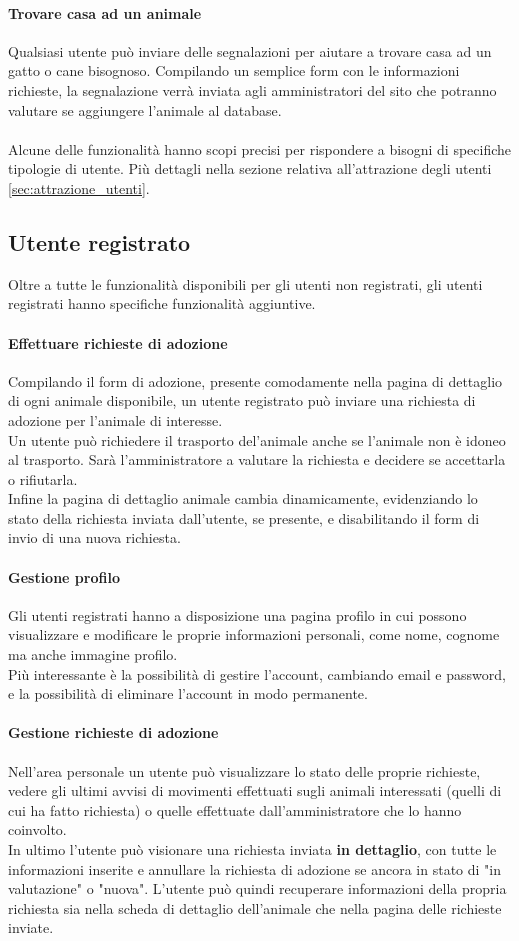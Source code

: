 \paragraph{Trovare casa ad un animale}
Qualsiasi utente può inviare delle segnalazioni per aiutare a trovare casa ad un gatto o cane bisognoso. Compilando un semplice form con le informazioni richieste, la segnalazione verrà inviata agli amministratori del sito che potranno valutare se aggiungere l'animale al database.\\\\
Alcune delle funzionalità hanno scopi precisi per rispondere a bisogni di specifiche tipologie di utente. Più dettagli nella sezione relativa all'attrazione degli utenti \ref{sec:attrazione_utenti}.
\subsection{Utente registrato}
Oltre a tutte le funzionalità disponibili per gli utenti non registrati, gli utenti registrati hanno specifiche funzionalità aggiuntive.
\paragraph{Effettuare richieste di adozione}
Compilando il form di adozione, presente comodamente nella pagina di dettaglio di ogni animale disponibile, un utente registrato può inviare una richiesta di adozione per l'animale di interesse.\\
Un utente può richiedere il trasporto del'animale anche se l'animale non è idoneo al trasporto. Sarà l'amministratore a valutare la richiesta e decidere se accettarla o rifiutarla.\\
Infine la pagina di dettaglio animale cambia dinamicamente, evidenziando lo stato della richiesta inviata dall'utente, se presente, e disabilitando il form di invio di una nuova richiesta.
\paragraph{Gestione profilo}
Gli utenti registrati hanno a disposizione una pagina profilo in cui possono visualizzare e modificare le proprie informazioni personali, come nome, cognome ma anche immagine profilo.\\
Più interessante è la possibilità di gestire l'account, cambiando email e password, e la possibilità di eliminare l'account in modo permanente.
\paragraph{Gestione richieste di adozione}
Nell'area personale un utente può visualizzare lo stato delle proprie richieste, vedere gli ultimi avvisi di movimenti effettuati sugli animali interessati (quelli di cui ha fatto richiesta) o quelle effettuate dall'amministratore che lo hanno coinvolto.\\ 
In ultimo l'utente può visionare una richiesta inviata \textbf{in dettaglio}, con tutte le informazioni inserite e annullare la richiesta di adozione se ancora in stato di "in valutazione" o "nuova". L'utente può quindi recuperare informazioni della propria richiesta sia nella scheda di dettaglio dell'animale che nella pagina delle richieste inviate.

